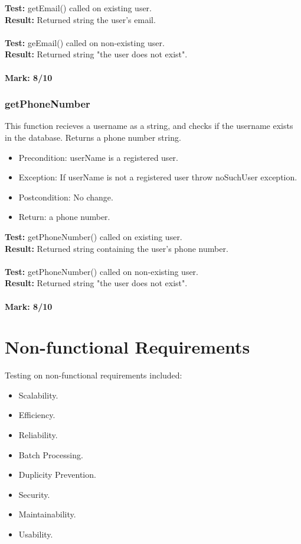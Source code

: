 \documentclass[12pt]{article}
\begin{document}
		\noindent \textbf{Test:} getEmail() called on existing user.\\
		\textbf{Result:} Returned string the user's email.\\\\
		\textbf{Test:} geEmail() called on non-existing user.\\
		\textbf{Result:} Returned string "the user does not exist".\\ \\
		\textbf{Mark: 8/10}
		
		
		\subsubsection{getPhoneNumber}
			This function recieves a username as a string, and checks if the username exists in the database. Returns a phone number string.
		
		\begin{itemize}
			\item Precondition: userName is a registered user.
			\item Exception: If userName is not a registered user throw noSuchUser exception.
			\item Postcondition: No change.
			\item Return: a phone number.
		\end{itemize}
			
		\noindent \textbf{Test:} getPhoneNumber() called on existing user.\\
		\textbf{Result:} Returned string containing the user's phone number.\\\\
		\textbf{Test:} getPhoneNumber() called on non-existing user.\\
		\textbf{Result:} Returned string "the user does not exist".\\
		\\ 
		\textbf{Mark: 8/10}
	

\pagebreak
\section{Non-functional Requirements}
	Testing on non-functional requirements included:\\

	\begin{itemize}
		\item Scalability.
		\item Efficiency.
		\item Reliability.
		\item Batch Processing.
		\item Duplicity Prevention.
		\item Security.
		\item Maintainability.
		\item Usability.
	\end{itemize}
\end{document}
